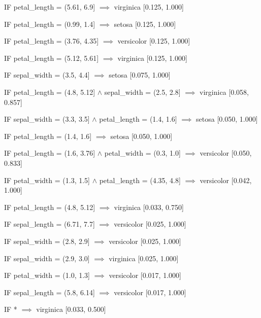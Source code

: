 IF petal\_length = (5.61, 6.9] $\implies$ virginica [0.125, 1.000]

IF petal\_length = (0.99, 1.4] $\implies$ setosa [0.125, 1.000]

IF petal\_length = (3.76, 4.35] $\implies$ versicolor [0.125, 1.000]

IF petal\_length = (5.12, 5.61] $\implies$ virginica [0.125, 1.000]

IF sepal\_width = (3.5, 4.4] $\implies$ setosa [0.075, 1.000]

IF petal\_length = (4.8, 5.12] $\land$ sepal\_width = (2.5, 2.8] $\implies$ virginica [0.058, 0.857]

IF sepal\_width = (3.3, 3.5] $\land$ petal\_length = (1.4, 1.6] $\implies$ setosa [0.050, 1.000]

IF petal\_length = (1.4, 1.6] $\implies$ setosa [0.050, 1.000]

IF petal\_length = (1.6, 3.76] $\land$ petal\_width = (0.3, 1.0] $\implies$ versicolor [0.050, 0.833]

IF petal\_width = (1.3, 1.5] $\land$ petal\_length = (4.35, 4.8] $\implies$ versicolor [0.042, 1.000]

IF petal\_length = (4.8, 5.12] $\implies$ virginica [0.033, 0.750]

IF sepal\_length = (6.71, 7.7] $\implies$ versicolor [0.025, 1.000]

IF sepal\_width = (2.8, 2.9] $\implies$ versicolor [0.025, 1.000]

IF sepal\_width = (2.9, 3.0] $\implies$ virginica [0.025, 1.000]

IF petal\_width = (1.0, 1.3] $\implies$ versicolor [0.017, 1.000]

IF sepal\_length = (5.8, 6.14] $\implies$ versicolor [0.017, 1.000]

IF * $\implies$ virginica [0.033, 0.500]
